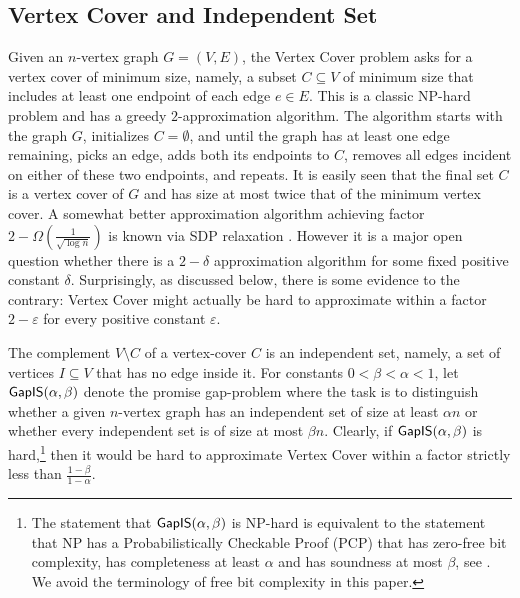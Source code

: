 \documentclass[11pt]{article}
\numberwithin{equation}{section}
\theoremstyle{definition}
\theoremstyle{plain}
\newcommand\eps{\varepsilon}
\begin{document}
\subsection{Vertex Cover and Independent Set}
Given an $n$-vertex  graph
$G=(V,E)$, the Vertex Cover problem asks for a
vertex cover of minimum size, namely, a subset $C \subseteq V$ of minimum size that includes
  at least one  endpoint of each edge $e \in E$. This is a classic NP-hard problem and
 has a greedy $2$-approximation algorithm. The algorithm starts with the graph $G$, initializes $C = \emptyset$, and
 until the graph has at least one edge remaining, picks an edge,
adds both its endpoints to $C$, removes all edges incident on either of these two endpoints, and repeats. It is easily seen
that the final set $C$ is a vertex cover of $G$ and has size at most twice that of the minimum vertex cover.  A somewhat better
approximation algorithm achieving factor $2- \Omega\left(\frac{1}{\sqrt{\log n}}\right)$  is known via SDP relaxation \cite{Hal02,Kara09}. However it is a
major open question whether there is a $2-\delta$ approximation algorithm for some fixed positive
constant $\delta$. Surprisingly, as discussed below, there is some evidence to the
contrary: Vertex Cover might actually be hard to approximate
 within a factor $2-\eps$ for every positive constant $\eps$.


The complement $V \setminus C$  of a vertex-cover $C$ is an independent set,
namely, a set of vertices $I \subseteq V$ that has no edge inside it. For constants $0 < \beta < \alpha <1$,
let ${\sf GapIS}(\alpha, \beta)$ denote
the promise gap-problem where the task is to distinguish whether a given $n$-vertex graph has an independent set
of size at least $\alpha n$ or whether every independent set is of size at most $\beta n$. Clearly, if
${\sf GapIS}(\alpha, \beta)$ is hard,\footnote{The statement that ${\sf GapIS}(\alpha, \beta)$ is NP-hard is
equivalent to the statement that NP has a Probabilistically Checkable Proof (PCP) that has zero-free bit complexity,
has completeness at least $\alpha$ and has soundness at most $\beta$, see \cite[Proposition 5.6, Theorem 8.2]{BGS}. We avoid
 the terminology of free bit complexity in this paper.}
 then it would be hard to approximate Vertex Cover  within a factor
strictly less than $\frac{1-\beta}{1-\alpha}$.
\end{document}
